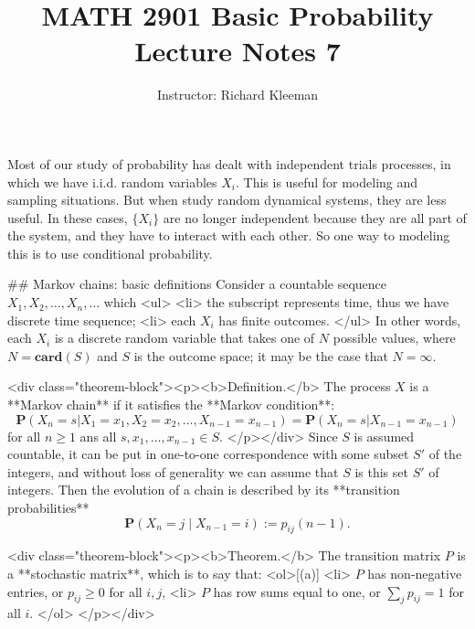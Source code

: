


\title{MATH 2901 Basic Probability Lecture Notes 7}
\author{Instructor: Richard Kleeman}
\date{}
\maketitle


Most of our study of probability has dealt with independent trials processes, in which we have i.i.d. random variables $X_i$. This is useful for modeling and sampling situations. But when study random dynamical systems, they are less useful. In these cases, $\{X_i\}$ are no longer independent because they are all part of the system, and they have to interact with each other. So one way to modeling this is to use conditional probability. 

## Markov chains: basic definitions
Consider a countable sequence $X_1, X_2, \dots, X_n, \dots$ which 
<ul>
    <li> the subscript represents time, thus we have discrete time sequence;
    <li> each $X_i$ has finite outcomes.
</ul>
In other words, each $X_i$ is a discrete random variable that takes one of $N$ possible values, where 
$N = \mathbf{card}(S)$ and $S$ is the outcome space; it may be the case that $N = \infty$.

<div class="theorem-block"><p><b>Definition.</b> 
The process $X$ is a **Markov chain** if it satisfies the **Markov condition**:
$$\begin{equation}
    \mathbf{P}\left(X_{n}=s | X_{1}=x_{1}, X_{2}=x_{2}, \ldots, X_{n-1}=x_{n-1}\right)=\mathbf{P}\left(X_{n}=s | X_{n-1}=x_{n-1}\right)
\end{equation}$$
for all $n\geq 1$ ans all $s, x_1, \dots, x_{n-1} \in S$.
</p></div>
Since $S$ is assumed countable, it can be put in one-to-one correspondence with some subset $S'$ of the integers, and without loss of generality we can assume that $S$ is this set $S'$ of integers. Then the evolution of a chain is described by its **transition probabilities** 
$$$$$$$$\begin{equation}
    \label{eq:7.1}
    \tag{7-1}
    \mathbf{P}(X_{n} = j \;\vert\; X_{n-1} = i) := p_{ij}(n-1).
\end{equation}$$$$$$$$

<div class="theorem-block"><p><b>Theorem.</b> 
The transition matrix $P$ is a **stochastic matrix**, which is to say that: 
<ol>[(a)]
    <li> $P$ has non-negative entries, or $p_{ij} \geq 0$ for all $i, j$, 
    <li> $P$ has row sums equal to one, or $\sum_j p_{ij} = 1$ for all $i$.
</ol>
</p></div>

